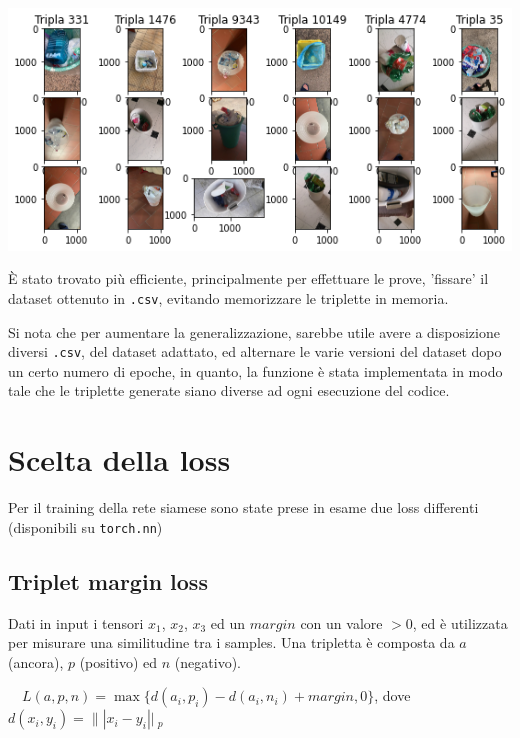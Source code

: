 \documentclass[11pt]{article}
\begin{document}
\begin{center}
    \begin{minipage}{0.6\linewidth}
    \includegraphics[width=\linewidth]{triplet_dataset.png}
    \end{minipage}
\end{center}

È stato trovato più efficiente, principalmente per effettuare le prove, 'fissare' il dataset ottenuto in
\texttt{.csv}, evitando memorizzare le triplette in memoria. 

Si nota che per aumentare la generalizzazione, sarebbe utile avere a disposizione diversi
\texttt{.csv}, del dataset adattato, ed alternare le varie versioni del dataset dopo un certo numero di epoche, 
in quanto, la funzione è stata implementata in modo tale che le triplette generate siano diverse ad ogni esecuzione del codice.

\section{Scelta della loss}

Per il training della rete siamese sono state prese in esame due loss differenti (disponibili su \texttt{torch.nn})

\subsection{Triplet margin loss}
Dati in input i tensori $x_1$, $x_2$, $x_3$ ed un $margin$ con un valore $> 0$, ed è
utilizzata per misurare una similitudine tra i samples.
Una tripletta è composta da $a$ (ancora), $p$ (positivo) ed $n$ (negativo). 
\begin{center}
    \ \
    $L(a,p,n) = \max{ \{ d(a_i, p_i) - d(a_i, n_i) + margin, 0 \} }$, dove \ \
    \\
    $d(x_i, y_i) = \|| x_i - y_i ||\ _p$
    \ \
\end{center}
\end{document}
